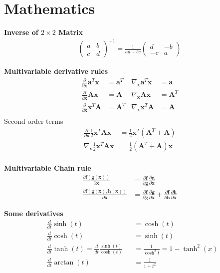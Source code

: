 \setcounter{section}{7}
\section{Mathematics}
\textbf{Inverse of \(2\times2\) Matrix}
\begin{align*}
    \begin{pmatrix}
        a & b \\ c & d 
        \end{pmatrix}^{-1} = 
    \frac{1}{ad-bc}
    \begin{pmatrix}
        d & -b \\ -c & a 
    \end{pmatrix}
\end{align*}

\textbf{Multivariable derivative rules}
\begin{align*}
    \frac{\partial}{\partial\bm{x}} \bm{a}^T\bm{x} &=  \bm{a}^T &
    \nabla_{\bm{x}}\bm{a}^T\bm{x} &=  \bm{a} \\
    \frac{\partial}{\partial\bm{x}} \bm{Ax} &=  \bm{A} &
    \nabla_{\bm{x}}\bm{Ax} &= \bm{A}^T  \\
    \frac{\partial}{\partial\bm{x}} \bm{x}^T\bm{A} &=  \bm{A}^T &
    \nabla_{\bm{x}}\bm{x}^T\bm{A} &= \bm{A} \\
\end{align*}
Second order terms
\begin{align*}
    \frac{\partial}{\partial\bm{x}} \frac{1}{2}\bm{x}^T\bm{Ax} &=  \frac{1}{2}\bm{x}^T(\bm{A}^T+\bm{A}) \\
    \nabla_{\bm{x}} \frac{1}{2}\bm{x}^T\bm{Ax} &=  \frac{1}{2}(\bm{A}^T+\bm{A})\bm{x} \\
\end{align*}

\textbf{Multivariable Chain rule}
\begin{align*}
    \frac{\partial\bm{f}(\bm{g}(\bm{x}))}{\partial\bm{x}} &= \frac{\partial\bm{f}}{\partial\bm{g}}
    \frac{\partial\bm{g}}{\partial\bm{x}} \\
    \frac{\partial\bm{f}(\bm{g}(\bm{x}),\bm{h}(\bm{x}))}{\partial\bm{x}} &= \frac{\partial\bm{f}}{\partial\bm{g}}
     \frac{\partial\bm{g}}{\partial\bm{x}} + \frac{\partial\bm{f}}{\partial\bm{h}}\frac{\partial\bm{h}}{\partial\bm{x}}
\end{align*}

\textbf{Some derivatives}
\begin{align*}
    &\frac{d}{dt}\sinh(t) &&= \cosh(t) \\
    &\frac{d}{dt}\cosh(t) &&= \sinh(t) \\
    &\frac{d}{dt}\tanh(t) = \frac{d}{dt}\frac{\sinh(t)}{\cosh(t)} &&= \frac{1}{\cosh^2t} = 1-\tanh^2(x) \\
    &\frac{d}{dt}\arctan(t) &&= \frac{1}{1+t^2} \\
\end{align*}

